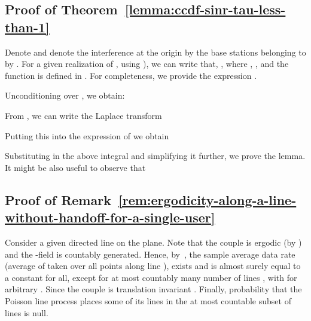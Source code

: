 \documentclass[10pt,journal]{IEEEtran}
\begin{document}
 
  \subsection{Proof of Theorem~\ref{lemma:ccdf-sinr-tau-less-than-1}}
\label{subsection:proof-of-lemma-ccdf-sinr-tau-less-than-1}
Denote  and denote the interference at the origin 
by the base stations belonging to  by . 
For a given realization of , using
\cite[Corollary~]{bartek-keeler15sinr-process-poisson-networks-factorial-moment-measures}),
we can write 
 that, 
, where , ,
and the function 
 is defined in \cite[Equation~]{bartek-keeler15sinr-process-poisson-networks-factorial-moment-measures}. 
For completeness, we provide the expression 
. 

Unconditioning 
over , we obtain: 

From
\cite[Equation~]{bartek-muhlethaler15interference-aware-sinr-coverage-aloha-arxiv},
we can write the Laplace transform 

Putting this 
into the expression of  we obtain
\footnotesize

\normalsize

 Substituting  in the above 
integral and simplifying it further, we prove the lemma.
It might be also useful to observe that 




 \subsection{Proof of Remark~\ref{rem:ergodicity-along-a-line-without-handoff-for-a-single-user}}
\label{subsection:proof-of-ergodicity-theorem}
 Consider a given  directed line  on the plane.
 Note that the couple  is ergodic (by \cite[Proposition~]{meester-roy96continuum-percolation})  and the -field  is countably generated.
Hence,
 by~\cite[Proposition~]{meester-roy96continuum-percolation}, the sample average data 
 rate (average of   taken over all points  along  line ), exists and is almost surely equal to a constant
  for all, except for at most countably many number of lines
 , with  for arbitrary   .
 Since the couple  is translation invariant
 . Finally, probability that the
 Poisson line process  places some of its lines
 in the at most countable subset of lines  is null.
\end{document}

